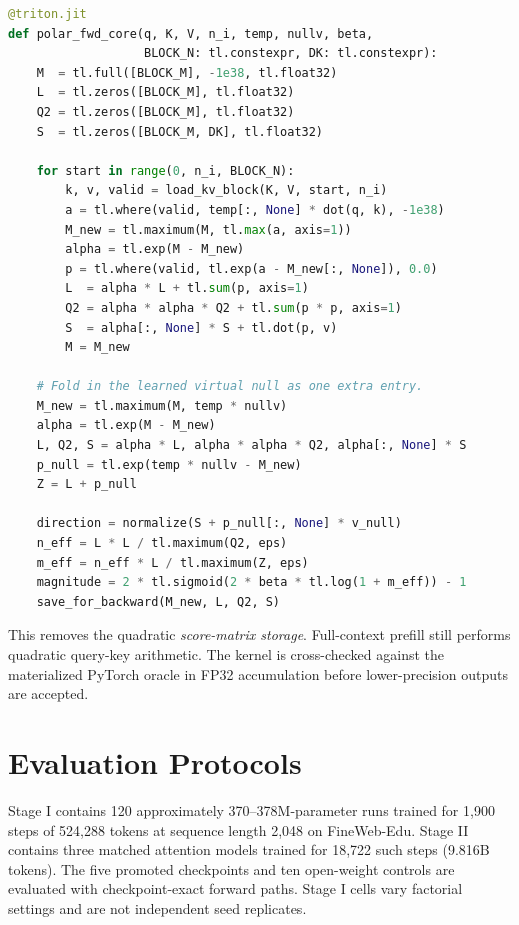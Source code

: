 \begin{lstlisting}[language=Python,caption={Schematic core of the block-streamed Triton forward pass.},label={lst:polar_triton}]
@triton.jit
def polar_fwd_core(q, K, V, n_i, temp, nullv, beta,
                   BLOCK_N: tl.constexpr, DK: tl.constexpr):
    M  = tl.full([BLOCK_M], -1e38, tl.float32)
    L  = tl.zeros([BLOCK_M], tl.float32)
    Q2 = tl.zeros([BLOCK_M], tl.float32)
    S  = tl.zeros([BLOCK_M, DK], tl.float32)

    for start in range(0, n_i, BLOCK_N):
        k, v, valid = load_kv_block(K, V, start, n_i)
        a = tl.where(valid, temp[:, None] * dot(q, k), -1e38)
        M_new = tl.maximum(M, tl.max(a, axis=1))
        alpha = tl.exp(M - M_new)
        p = tl.where(valid, tl.exp(a - M_new[:, None]), 0.0)
        L  = alpha * L + tl.sum(p, axis=1)
        Q2 = alpha * alpha * Q2 + tl.sum(p * p, axis=1)
        S  = alpha[:, None] * S + tl.dot(p, v)
        M = M_new

    # Fold in the learned virtual null as one extra entry.
    M_new = tl.maximum(M, temp * nullv)
    alpha = tl.exp(M - M_new)
    L, Q2, S = alpha * L, alpha * alpha * Q2, alpha[:, None] * S
    p_null = tl.exp(temp * nullv - M_new)
    Z = L + p_null

    direction = normalize(S + p_null[:, None] * v_null)
    n_eff = L * L / tl.maximum(Q2, eps)
    m_eff = n_eff * L / tl.maximum(Z, eps)
    magnitude = 2 * tl.sigmoid(2 * beta * tl.log(1 + m_eff)) - 1
    save_for_backward(M_new, L, Q2, S)
\end{lstlisting}

This removes the quadratic \emph{score-matrix storage}. Full-context prefill still performs quadratic query-key arithmetic. The kernel is cross-checked against the materialized PyTorch oracle in FP32 accumulation before lower-precision outputs are accepted.

\section{Evaluation Protocols}
\label{appendix:protocol}

Stage I contains 120 approximately 370--378M-parameter runs trained for 1,900 steps of 524,288 tokens at sequence length 2,048 on FineWeb-Edu. Stage II contains three matched attention models trained for 18,722 such steps (9.816B tokens). The five promoted checkpoints and ten open-weight controls are evaluated with checkpoint-exact forward paths. Stage I cells vary factorial settings and are not independent seed replicates.

